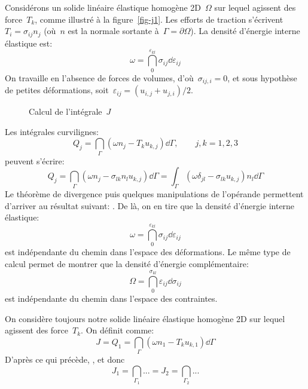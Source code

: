 Considérons un solide linéaire élastique homogène 2D~$\Omega$ sur lequel agissent des force~$T_k$, comme illustré à la figure~\ref{fig-j1}. Les efforts de traction s'écrivent~$T_i=\sigma_{ij}n_j$ (où~$n$ est la normale sortante à~$\Gamma=\partial\Omega$). La densité d'énergie interne élastique est:
\begin{equation}
\omega=\dint_0^{\varepsilon_{kl}} \sigma_{ij}\dd\varepsilon_{ij}
\end{equation}
On travaille en l'absence de forces de volumes, d'où~$\sigma_{ij,i}=0$, et sous hypothèse de petites déformations, soit~$\varepsilon_{ij}=(u_{i,j}+u_{j,i})/2$.
\begin{figure}[ht]
\centering
{}\hspace{5em}
\caption{Calcul de l'intégrale~$J$}
\end{figure}
Les intégrales curvilignes:
\begin{equation}
Q_j =\dint_\Gamma \left(\omega n_j- T_k u_{k,j}\right)\dd\Gamma,\qquad j, k=1,2,3
\end{equation}
peuvent s'écrire:
\begin{equation}
Q_j =\dint_\Gamma \left(\omega n_j- \sigma_{lk}n_l u_{k,j}\right)\dd\Gamma
=\int_\Gamma \left(\omega \delta_{jl}- \sigma_{lk} u_{k,j}\right)n_l \dd\Gamma
\end{equation}
Le théorème de divergence puis quelques manipulations de l'opérande permettent d'arriver au résultat suivant: . De là, on en tire que la densité d'énergie interne élastique:
\begin{equation}\omega=\dint_0^{\varepsilon_{kl}} \sigma_{ij}\dd\varepsilon_{ij}\end{equation}
est indépendante du chemin dans l'espace des déformations. Le même type de calcul permet de montrer que la densité d'énergie complémentaire:
\begin{equation}\Omega = \dint_0^{\sigma_{kl}} \varepsilon_{ij}\dd\sigma_{ij}\end{equation}
est indépendante du chemin dans l'espace des contraintes.

\medskip
On considère toujours notre solide linéaire élastique homogène 2D sur lequel agissent des force~$T_k$. On définit  comme:
\begin{equation} J = Q_1 =\dint_\Gamma \left(\omega n_1- T_k u_{k,1}\right)\dd\Gamma \end{equation}
D'après ce qui précède, , et donc
\begin{equation}J_1=\dint_{\Gamma_1} ... = J_2=\dint_{\Gamma_2} ...\end{equation}

